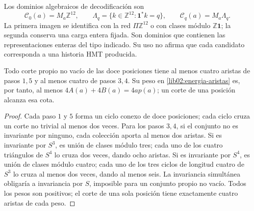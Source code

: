 Los dominios algebraicos de decodificación son
\[
 \mathcal C_0(a)=M_a\mathbb Z^{12},\qquad
 \Lambda_q=\{k\in\mathbb Z^{12}:\mathbf1^*k=q\},\qquad
 \mathcal C_q(a)=M_a\Lambda_q.
\]
La primera imagen se identifica con la red \(\Pi\mathbb Z^{12}\)
o con clases módulo \(\mathbb Z\mathbf1\); la segunda conserva una
carga entera fijada. Son dominios que contienen las representaciones enteras
del tipo indicado. Su uso no afirma que cada candidato corresponda a una
historia HMT producida.

\begin{lemma}
\label{lib02:cortes}
Todo corte propio no vacío de las doce posiciones tiene al menos cuatro
aristas de pasos \(1,5\) y al menos cuatro de pasos \(3,4\). Su peso
en \eqref{lib02:energia-aristas} es, por tanto, al menos
\(4A(a)+4B(a)=4ap(a)\); un corte de una posición alcanza esa cota.
\end{lemma}
\begin{proof}
Cada paso \(1\) y \(5\) forma un ciclo conexo de doce posiciones;
cada ciclo cruza un corte no trivial al menos dos veces. Para los pasos
\(3,4\), si el conjunto no es invariante por ninguno, cada colección
aporta al menos dos aristas. Si es invariante por \(S^3\), es unión
de clases módulo tres; cada uno de los cuatro triángulos de \(S^4\)
lo cruza dos veces, dando ocho aristas. Si es invariante por \(S^4\),
es unión de clases módulo cuatro; cada uno de los tres ciclos de longitud
cuatro de \(S^3\) lo cruza al menos dos veces, dando al menos seis.
La invariancia simultánea obligaría a invariancia por \(S\), imposible
para un conjunto propio no vacío. Todos los pesos son positivos; el
corte de una sola posición tiene exactamente cuatro aristas de cada
peso.
\end{proof}

